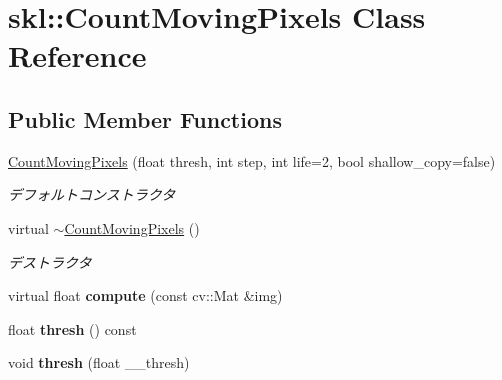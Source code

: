 \hypertarget{classskl_1_1_count_moving_pixels}{}\section{skl\+:\+:Count\+Moving\+Pixels Class Reference}
\label{classskl_1_1_count_moving_pixels}
\subsection*{Public Member Functions}
\begin{DoxyCompactItemize}
\item 
\hypertarget{classskl_1_1_count_moving_pixels_a2d5f19e230ff2bec120df5996374869f}{}\label{classskl_1_1_count_moving_pixels_a2d5f19e230ff2bec120df5996374869f} 
\hyperlink{classskl_1_1_count_moving_pixels_a2d5f19e230ff2bec120df5996374869f}{Count\+Moving\+Pixels} (float thresh, int step, int life=2, bool shallow\+\_\+copy=false)
\begin{DoxyCompactList}\small\item\em デフォルトコンストラクタ \end{DoxyCompactList}\item 
\hypertarget{classskl_1_1_count_moving_pixels_a2dcd33080fad0140b763be8aded3f993}{}\label{classskl_1_1_count_moving_pixels_a2dcd33080fad0140b763be8aded3f993} 
virtual \hyperlink{classskl_1_1_count_moving_pixels_a2dcd33080fad0140b763be8aded3f993}{$\sim$\+Count\+Moving\+Pixels} ()
\begin{DoxyCompactList}\small\item\em デストラクタ \end{DoxyCompactList}\item 
\hypertarget{classskl_1_1_count_moving_pixels_afb1aa1df8ac9fcdc9c3f39d028aee762}{}\label{classskl_1_1_count_moving_pixels_afb1aa1df8ac9fcdc9c3f39d028aee762} 
virtual float {\bfseries compute} (const cv\+::\+Mat \&img)
\item 
\hypertarget{classskl_1_1_count_moving_pixels_ac0a55bad93f0a733ea859e21f7715102}{}\label{classskl_1_1_count_moving_pixels_ac0a55bad93f0a733ea859e21f7715102} 
float {\bfseries thresh} () const
\item 
\hypertarget{classskl_1_1_count_moving_pixels_af5e555709b161a5b8ac46dce1da7d467}{}\label{classskl_1_1_count_moving_pixels_af5e555709b161a5b8ac46dce1da7d467} 
void {\bfseries thresh} (float \+\_\+\+\_\+thresh)
\item 
\hypertarget{classskl_1_1_count_moving_pixels_a0bf84f91adb4d6b39330ee9469a9be00}{}\label{classskl_1_1_count_moving_pixels_a0bf84f91adb4d6b39330ee9469a9be00} 

\end{DoxyCompactItemize}
